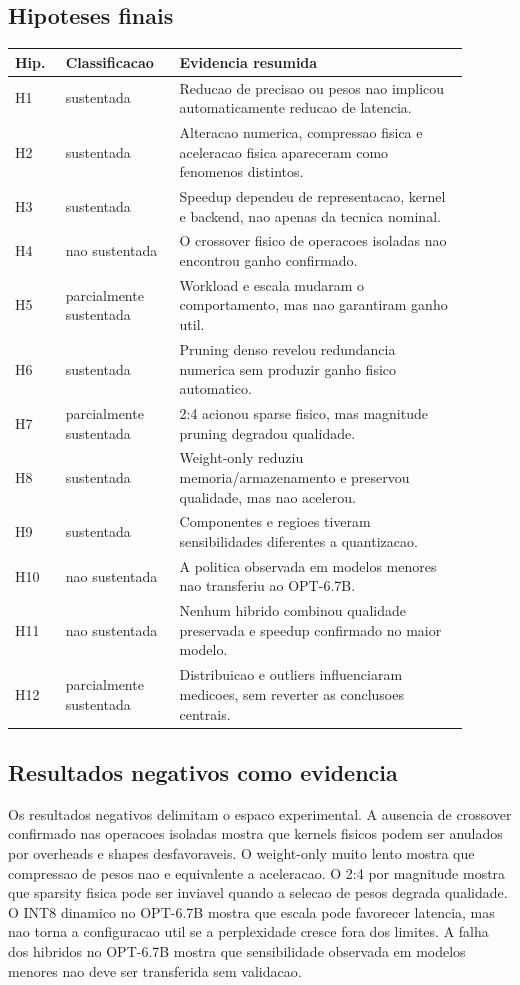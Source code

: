 \documentclass[12pt, a4paper]{article}
\begin{document}
\subsection{Hipoteses finais}

\begin{longtable}{p{0.10\linewidth}p{0.22\linewidth}p{0.58\linewidth}}
\toprule
\textbf{Hip.} & \textbf{Classificacao} & \textbf{Evidencia resumida} \\
\midrule
H1 & sustentada & Reducao de precisao ou pesos nao implicou automaticamente reducao de latencia. \\
H2 & sustentada & Alteracao numerica, compressao fisica e aceleracao fisica apareceram como fenomenos distintos. \\
H3 & sustentada & Speedup dependeu de representacao, kernel e backend, nao apenas da tecnica nominal. \\
H4 & nao sustentada & O crossover fisico de operacoes isoladas nao encontrou ganho confirmado. \\
H5 & parcialmente sustentada & Workload e escala mudaram o comportamento, mas nao garantiram ganho util. \\
H6 & sustentada & Pruning denso revelou redundancia numerica sem produzir ganho fisico automatico. \\
H7 & parcialmente sustentada & 2:4 acionou sparse fisico, mas magnitude pruning degradou qualidade. \\
H8 & sustentada & Weight-only reduziu memoria/armazenamento e preservou qualidade, mas nao acelerou. \\
H9 & sustentada & Componentes e regioes tiveram sensibilidades diferentes a quantizacao. \\
H10 & nao sustentada & A politica observada em modelos menores nao transferiu ao OPT-6.7B. \\
H11 & nao sustentada & Nenhum hibrido combinou qualidade preservada e speedup confirmado no maior modelo. \\
H12 & parcialmente sustentada & Distribuicao e outliers influenciaram medicoes, sem reverter as conclusoes centrais. \\
\bottomrule
\end{longtable}

\subsection{Resultados negativos como evidencia}

Os resultados negativos delimitam o espaco experimental. A ausencia de
crossover confirmado nas operacoes isoladas mostra que kernels fisicos podem
ser anulados por overheads e shapes desfavoraveis. O weight-only muito lento
mostra que compressao de pesos nao e equivalente a aceleracao. O 2:4 por
magnitude mostra que sparsity fisica pode ser inviavel quando a selecao de
pesos degrada qualidade. O INT8 dinamico no OPT-6.7B mostra que escala pode
favorecer latencia, mas nao torna a configuracao util se a perplexidade cresce
fora dos limites. A falha dos hibridos no OPT-6.7B mostra que sensibilidade
observada em modelos menores nao deve ser transferida sem validacao.
\end{document}
